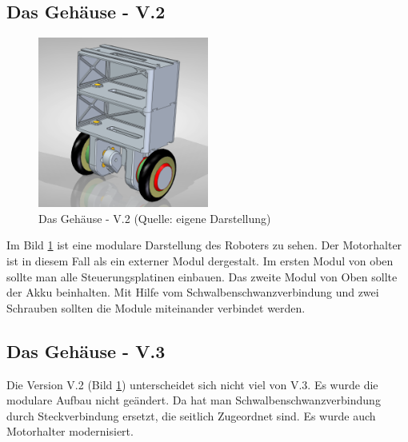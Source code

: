 \subsection{Das Gehäuse - V.2}
\begin{figure}[!h]  %
	\centering\includegraphics[width=0.5\textwidth]{images/gehaeuse-v2.png}
	\caption{Das Gehäuse - V.2 \newline (Quelle: eigene Darstellung)}
	\label{gehaeuse-v2} %
\end{figure}
Im Bild \ref{gehaeuse-v2} ist eine modulare Darstellung des Roboters zu sehen. Der Motorhalter ist in diesem Fall als ein externer Modul dergestalt. Im ersten Modul von oben sollte man alle Steuerungsplatinen  einbauen. Das zweite Modul von Oben sollte  der Akku beinhalten. Mit Hilfe vom Schwalbenschwanzverbindung und zwei Schrauben sollten die Module miteinander verbindet werden.

\subsection{Das Gehäuse - V.3}

Die Version V.2 (Bild \ref{gehaeuse-v2}) unterscheidet sich nicht viel von V.3. Es wurde die modulare Aufbau nicht geändert. Da hat man Schwalbenschwanzverbindung durch Steckverbindung ersetzt, die seitlich Zugeordnet sind. Es wurde auch Motorhalter modernisiert.

